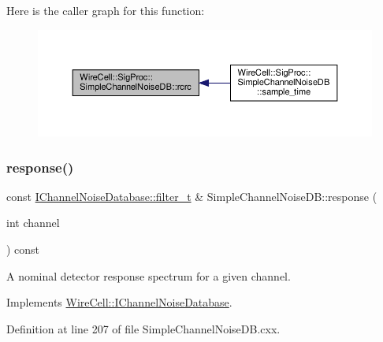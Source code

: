 Here is the caller graph for this function\+:
\nopagebreak
\begin{figure}[H]
\begin{center}
\leavevmode
\includegraphics[width=350pt]{class_wire_cell_1_1_sig_proc_1_1_simple_channel_noise_d_b_a9a4481bf485a0aaa4903094463f4e2b3_icgraph}
\end{center}
\end{figure}
\mbox{\label{class_wire_cell_1_1_sig_proc_1_1_simple_channel_noise_d_b_ac86433de014502928205161b6ea93ba0}} 
\subsubsection{\texorpdfstring{response()}{response()}}
{\footnotesize\ttfamily const \hyperlink{class_wire_cell_1_1_i_channel_noise_database_a0acbae29743542eb1c652f7a56e692f5}{I\+Channel\+Noise\+Database\+::filter\+\_\+t} \& Simple\+Channel\+Noise\+D\+B\+::response (\begin{DoxyParamCaption}\item[{int}]{channel }\end{DoxyParamCaption}) const\hspace{0.3cm}{\ttfamily [virtual]}}



A nominal detector response spectrum for a given channel. 



Implements \hyperlink{class_wire_cell_1_1_i_channel_noise_database_ad3c42f59a26e8a8e115199a894d881da}{Wire\+Cell\+::\+I\+Channel\+Noise\+Database}.



Definition at line 207 of file Simple\+Channel\+Noise\+D\+B.\+cxx.

